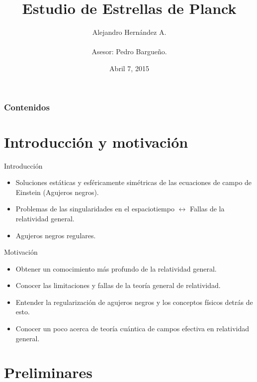 \documentclass[t]{beamer}
\title[Estrellas de Planck]{Estudio de Estrellas de Planck}
\author[Hernández A.]{Alejandro Hernández A. \\ {\ \\ \footnotesize Asesor: Pedro Bargueño.} }
\institute[Uniandes]  
{\normalsize
Universidad de los Andes, Bogotá, Colombia \\ 
}
\date{Abril 7, 2015}
\numberwithin{equation}{section}
\begin{document}
\begin{frame}
\titlepage 
\end{frame}

\begin{frame}
\frametitle{Contenidos} 
\tableofcontents 
\end{frame}

\section{Introducción y motivación}

\begin{frame}{Introducción}
\vspace{\fill}
\begin{itemize}
\item Soluciones estáticas y esféricamente simétricas de las ecuaciones de campo de Einstein (Agujeros negros).


\item Problemas de las singularidades en el espaciotiempo $\leftrightarrow$ Fallas de la relatividad general.

\item Agujeros negros regulares.
\end{itemize}
\end{frame}

\begin{frame}{Motivación}
\vspace{\fill}
\begin{itemize}
\item Obtener un comocimiento más profundo de la relatividad general.

\item Conocer las limitaciones y fallas de la teoría general de relatividad.

\item Entender la regularización de agujeros negros y los conceptos físicos detrás de esto.

\item Conocer un poco acerca de teoría cuántica de campos efectiva en relatividad general.

\end{itemize}
\vspace{\fill}
\end{frame}


\section{\label{preliminaries section} Preliminares}
\end{document}
